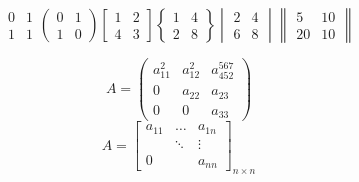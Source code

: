 \documentclass{ctexart}	%
\begin{document}
	\[
	\begin{matrix}
		0&1 \\
		1&1
	\end{matrix}
	\begin{pmatrix}
		0&1\\
		1&0
	\end{pmatrix}
	\begin{bmatrix}
		1&2\\
		4&3
	\end{bmatrix}
	\begin{Bmatrix}
		1&4\\
		2&8
	\end{Bmatrix}
	\begin{vmatrix}
		2&4\\
		6&8
	\end{vmatrix}
	\begin{Vmatrix}
		5&10\\
		20&10
	\end{Vmatrix}
	\]
	
	\[
	A=\begin{pmatrix}
		a_{11}^2&a_{12}^2&a_{452}^{567}\\
		0&a_{22}&a_{23}\\
		0&0&a_{33}
	\end{pmatrix}
	\]
	\[
	A=\begin{bmatrix}
	a_{11}&\dots&a_{1n}\\
	&\ddots&\vdots\\
	0&&a_{nn}
	\end{bmatrix}_{n \times n}
	\]
	
\end{document}
